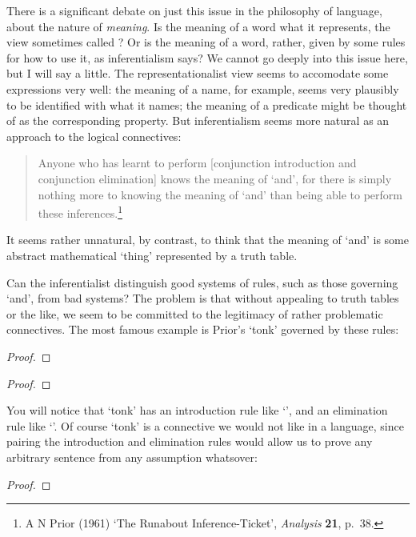 There is a significant debate on just this issue in the philosophy of language, about the nature of \emph{meaning}. Is the meaning of a word what it represents, the view sometimes called ? Or is the meaning of a word, rather, given by some rules for how to use it, as inferentialism says? We cannot go deeply into this issue here, but I will say a little. The representationalist view seems to accomodate some expressions very well: the meaning of a name, for example, seems very plausibly to be identified with what it names; the meaning of a predicate might be thought of as the corresponding property. But inferentialism seems more natural as an approach to the logical connectives: 
\begin{quote}
	Anyone who has learnt to perform [conjunction introduction and conjunction elimination] knows the meaning of ‘and’, for there is simply nothing more to knowing the meaning of ‘and’ than being able to perform these inferences.\footnote{A N Prior (1961) `The Runabout Inference-Ticket', \emph{Analysis} \textbf{21}, p.\ 38.}
\end{quote} It seems rather unnatural, by contrast, to think that the meaning of `and' is some abstract mathematical `thing' represented by a truth table.


Can the inferentialist distinguish good systems of rules, such as those governing `and', from bad systems? The problem is that without appealing to truth tables or the like, we seem to be committed to the legitimacy of rather problematic connectives. The most famous example is Prior's `tonk' governed by these rules:

\begin{multicols}{2}\noindent
	\begin{proof}
		\have[\ ]{}{\vdots}
		 
	\end{proof}

	\begin{proof}
		\have[\ ]{}{\vdots}
		 
	\end{proof}
\end{multicols}

You will notice that `tonk' has an introduction rule like `\eor', and an elimination rule like `\eand'. Of course `tonk' is a connective we would not like in a language, since pairing the introduction and elimination rules would allow us to prove any arbitrary sentence from any assumption whatsover: \begin{proof}
\end{proof}

